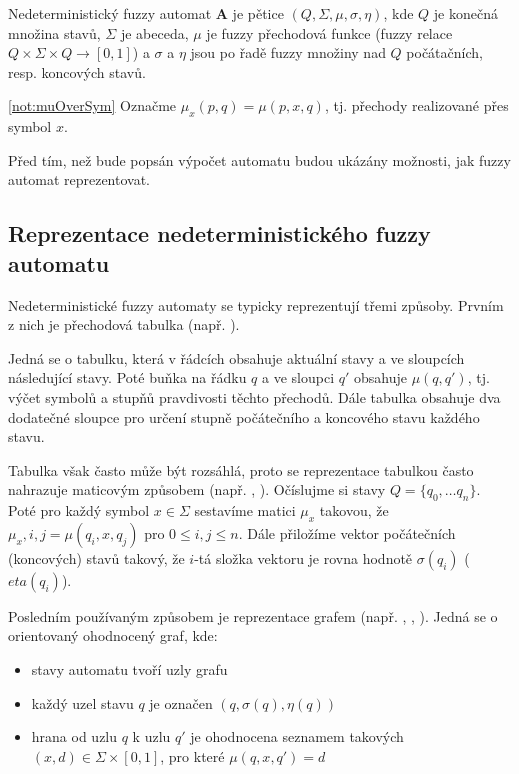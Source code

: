 \documentclass[a4paper,10pt]{article}
\begin{document}
\begin{definition}\label{def-ZaklDefNedFuzzAut}
 Nedeterministický fuzzy automat $\mathbf{A}$ je pětice $(Q, \Sigma, \mu, \sigma, \eta)$, kde $Q$ je konečná množina stavů, $\Sigma$ je abeceda, $\mu$ je fuzzy přechodová funkce (fuzzy relace $Q \times \Sigma \times Q \rightarrow [0, 1]$) a $\sigma$ a $\eta$ jsou po řadě fuzzy množiny nad $Q$ počátačních, resp. koncových stavů.
\end{definition}

\begin{notation} \ref{not:muOverSym}
 Označme $\mu_x(p, q) = \mu(p, x, q)$, tj. přechody realizované přes symbol $x$.
\end{notation}

Před tím, než bude popsán výpočet automatu budou ukázány možnosti, jak fuzzy automat reprezentovat.

\subsection{Reprezentace nedeterministického fuzzy automatu}
Nedeterministické fuzzy automaty se typicky reprezentují třemi způsoby. Prvním z nich je přechodová tabulka (např. \cite{DooKre-NewDirFuzzAut}). 

Jedná se o tabulku, která v řádcích obsahuje aktuální stavy a ve sloupcích následující stavy. Poté buňka na řádku $q$ a ve sloupci $q'$ obsahuje $\mu(q, q')$, tj. výčet symbolů a stupňů pravdivosti těchto přechodů. Dále tabulka obsahuje dva dodatečné sloupce pro určení stupně počátečního a koncového stavu každého stavu.

Tabulka však často může být rozsáhlá, proto se reprezentace tabulkou často nahrazuje maticovým způsobem (např. \cite{SnaKepAbrHas-AproxStriMatchFuzzAut}, \cite{StaCir-ConsFuzzAutFuzzRegExp}). Očíslujme si stavy $Q = \{ q_0, \dots q_n \}$. Poté pro každý symbol $x \in \Sigma$ sestavíme matici $\mu_x$ takovou, že $\mu_x,{i,j} = \mu(q_i, x, q_j)$ pro $0 \leq i,j \leq n$. Dále přiložíme vektor počátečních (koncových) stavů takový, že $i$-tá složka vektoru je rovna hodnotě $\sigma(q_i)$ ($eta(q_i)$).

Posledním používaným způsobem je reprezentace grafem (např. \cite{DooKre-NewDirFuzzAut}, \cite{GonGar-FuzzLangInfRanAccGuzzAutPumLemDetProc}, \cite{StaCir-ConsFuzzAutFuzzRegExp}). Jedná se o orientovaný ohodnocený graf, kde:
\begin{itemize}
 \item stavy automatu tvoří uzly grafu
 \item každý uzel stavu $q$ je označen $(q, \sigma(q), \eta(q))$
 \item hrana od uzlu $q$ k uzlu $q'$ je ohodnocena seznamem takových $(x, d) \in \Sigma \times [0,1]$, pro které $\mu(q, x, q') = d$
\end{itemize}
\end{document}
